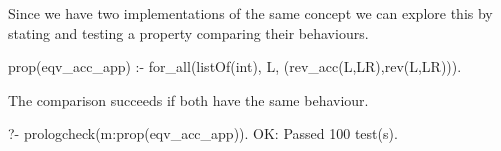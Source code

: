 Since we have two implementations of the same concept we can explore
this by stating and testing a property comparing their behaviours.
%
\begin{yapcode}
 prop(eqv_acc_app) :-
   for_all(listOf(int), L, (rev_acc(L,LR),rev(L,LR))).
\end{yapcode}
The comparison succeeds if both have the same behaviour.
%
\begin{yapcode}
   ?- prologcheck(m:prop(eqv_acc_app)).
 OK: Passed 100 test(s).
\end{yapcode}












